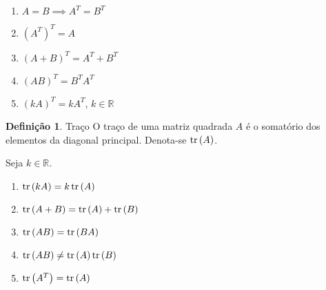 \documentclass{article}
\theoremstyle{definition}
\newtheorem{definition}{Definição}
\theoremstyle{remark}
\begin{document}
    \theoremstyle{definition}
    \begin{enumerate}
        \item $A = B \implies A^T = B^T$
        \item $\left( A^T \right)^T = A$
        \item $(A + B)^T = A^T + B^T$
        \item $(AB)^T = B^T A^T$
        \item $(kA)^T = kA^T$, $k \in \mathbb{R}$
    \end{enumerate}
    \begin{definition}{Traço}
        O traço de uma matriz quadrada $A$ é o somatório dos elementos da diagonal principal. Denota-se $\mathrm{tr} \left( A \right)$.
    \end{definition}
    Seja $k \in \mathbb{R}$.
    \begin{enumerate}
        \item $\mathrm{tr} \left( kA \right) = k\, \mathrm{tr} \left( A \right)$
        \item $\mathrm{tr} \left( A+B \right) = \mathrm{tr} \left( A \right) + \mathrm{tr} \left( B \right)$
        \item $\mathrm{tr} \left( AB \right) = \mathrm{tr} \left( BA \right)$
        \item $\mathrm{tr} \left( AB \right) \neq \mathrm{tr} \left( A \right) \mathrm{tr} \left( B \right)$
        \item $\mathrm{tr} \left( A^T \right) = \mathrm{tr} \left( A \right)$
    \end{enumerate}
\end{document}
